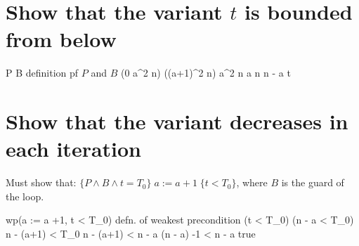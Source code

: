\documentclass[runningheads,12pt]{article}
\begin{document}

\section{Show that the variant $t$ is bounded from below}
 
\begin{calculation}
	P \land B
\hint{=} {definition pf $P$ and $B$}
	(0 \leq a^2 \leq n) \land ((a+1)^2 \leq n)
	a^2 \leq n
	a \leq \sqrt n
	\sqrt n - a \1
	t 
\end{calculation}

\section{Show that the variant decreases in each iteration}

Must show that: $\{P \land B \land t = T_0\}\; a := a + 1 \;\{t < T_0\}$, where $B$ is the guard of the loop. 

\begin{calculation}
	wp(a := a +1, t < T_0)
\hint{=} {defn. of weakest precondition}
	(t < T_0)\;[a := a+1]
	(\sqrt n - a < T_0)\;[a := a +1]
	\sqrt n - (a+1) < T_0
	\sqrt n - (a+1) < \sqrt n - a
	(\sqrt n - a) -1 < \sqrt n - a
	true
\end{calculation}
\end{document}
